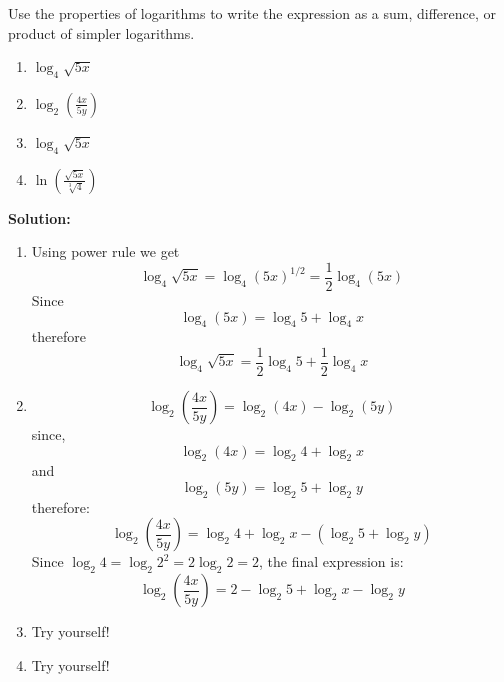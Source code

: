 


\begin{example}
  Use the properties of logarithms to write the expression as a sum,
  difference, or product of simpler logarithms.
  \begin{enumerate}
  \item $\log_{4}\sqrt{5x}$
  \item $\log_{2} \left(\frac{4x}{5y} \right)$
  \item $\log_{4}\sqrt{5x}$
  \item $\ln\left (\frac{\sqrt{5x}}{\sqrt[3]{4}} \right)$ %
  \end{enumerate}
\end{example}

\textbf{Solution:}
\begin{enumerate}
\item Using power rule we get
  \[
  \log_4 \sqrt{5x} = \log_4 (5x)^{1/2} = \frac{1}{2} \log_4 (5x)
  \]
  Since
  \[
   \log_4 (5x) =   \log_4 5 + \log_4 x 
  \]
  therefore
  \[
  \log_4 \sqrt{5x} = \frac{1}{2} \log_4 5 + \frac{1}{2} \log_4 x
\]

\item 
  \[
  \log_2 \left( \frac{4x}{5y} \right) = \log_2 (4x) - \log_2 (5y)
  \]
  since,
  \[
  \log_2 (4x) = \log_2 4 + \log_2 x
  \]
  and 
  \[
  \log_2 (5y) = \log_2 5 + \log_2 y
  \]
  therefore:
  \[
  \log_2 \left( \frac{4x}{5y} \right)=\log_2 4 + \log_2 x - (\log_2 5 + \log_2 y)
  \]
  Since \(\log_2 4 = \log_2 2^{2} = 2 \log_2 2 = 2\), the final expression is:
  \[
  \log_2 \left( \frac{4x}{5y} \right)=2 - \log_2 5 + \log_2 x - \log_2 y
  \]
\item Try yourself!
\item Try yourself!
\end{enumerate}



